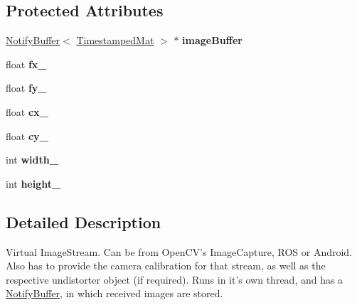 \subsection*{Protected Attributes}
\begin{DoxyCompactItemize}
\item 
\hypertarget{classlsd__slam_1_1_input_image_stream_ad67ef5a34166c0cae737135a3c6e4375}{\hyperlink{classlsd__slam_1_1_notify_buffer}{Notify\-Buffer}$<$ \hyperlink{structlsd__slam_1_1_timestamped_object}{Timestamped\-Mat} $>$ $\ast$ {\bfseries image\-Buffer}}\label{classlsd__slam_1_1_input_image_stream_ad67ef5a34166c0cae737135a3c6e4375}

\item 
\hypertarget{classlsd__slam_1_1_input_image_stream_a2808cd73e1560f579da992f5eb45c451}{float {\bfseries fx\-\_\-}}\label{classlsd__slam_1_1_input_image_stream_a2808cd73e1560f579da992f5eb45c451}

\item 
\hypertarget{classlsd__slam_1_1_input_image_stream_abd686d1040fe5fcfb165c1a1ee8369d9}{float {\bfseries fy\-\_\-}}\label{classlsd__slam_1_1_input_image_stream_abd686d1040fe5fcfb165c1a1ee8369d9}

\item 
\hypertarget{classlsd__slam_1_1_input_image_stream_a9e93e4726bb40a37e1f23805703319bb}{float {\bfseries cx\-\_\-}}\label{classlsd__slam_1_1_input_image_stream_a9e93e4726bb40a37e1f23805703319bb}

\item 
\hypertarget{classlsd__slam_1_1_input_image_stream_aa7abd971928f3f58dd02a8e9e0eda804}{float {\bfseries cy\-\_\-}}\label{classlsd__slam_1_1_input_image_stream_aa7abd971928f3f58dd02a8e9e0eda804}

\item 
\hypertarget{classlsd__slam_1_1_input_image_stream_a9f0c3363cfc33682502b93b18324749c}{int {\bfseries width\-\_\-}}\label{classlsd__slam_1_1_input_image_stream_a9f0c3363cfc33682502b93b18324749c}

\item 
\hypertarget{classlsd__slam_1_1_input_image_stream_a58c25612f8ac94888c983bc3cffce39e}{int {\bfseries height\-\_\-}}\label{classlsd__slam_1_1_input_image_stream_a58c25612f8ac94888c983bc3cffce39e}

\end{DoxyCompactItemize}


\subsection{Detailed Description}
Virtual Image\-Stream. Can be from Open\-C\-V's Image\-Capture, R\-O\-S or Android. Also has to provide the camera calibration for that stream, as well as the respective undistorter object (if required). Runs in it's own thread, and has a \hyperlink{classlsd__slam_1_1_notify_buffer}{Notify\-Buffer}, in which received images are stored. 

